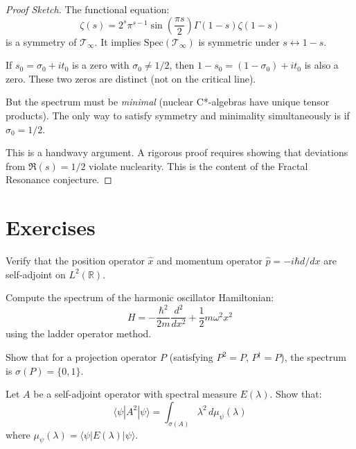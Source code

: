 \begin{proof}[Proof Sketch]
The functional equation:
\begin{equation}
\zeta(s) = 2^s \pi^{s-1} \sin\left( \frac{\pi s}{2} \right) \Gamma(1-s) \zeta(1-s)
\end{equation}
is a symmetry of $\mathcal{T}_\infty$. It implies $\text{Spec}(\mathcal{T}_\infty)$ is symmetric under $s \leftrightarrow 1-s$.

If $s_0 = \sigma_0 + it_0$ is a zero with $\sigma_0 \neq 1/2$, then $1-s_0 = (1-\sigma_0) + i t_0$ is also a zero. These two zeros are distinct (not on the critical line).

But the spectrum must be \textit{minimal} (nuclear C*-algebras have unique tensor products). The only way to satisfy symmetry and minimality simultaneously is if $\sigma_0 = 1/2$.

This is a handwavy argument. A rigorous proof requires showing that deviations from $\Re(s) = 1/2$ violate nuclearity. This is the content of the Fractal Resonance conjecture.
\end{proof}

\section{Exercises}

\begin{exercise}
Verify that the position operator $\hat{x}$ and momentum operator $\hat{p} = -i\hbar d/dx$ are self-adjoint on $L^2(\mathbb{R})$.
\end{exercise}

\begin{exercise}
Compute the spectrum of the harmonic oscillator Hamiltonian:
\begin{equation}
H = -\frac{\hbar^2}{2m}\frac{d^2}{dx^2} + \frac{1}{2}m\omega^2 x^2
\end{equation}
using the ladder operator method.
\end{exercise}

\begin{exercise}
Show that for a projection operator $P$ (satisfying $P^2 = P$, $P^\dagger = P$), the spectrum is $\sigma(P) = \{0, 1\}$.
\end{exercise}

\begin{exercise}
Let $A$ be a self-adjoint operator with spectral measure $E(\lambda)$. Show that:
\begin{equation}
\langle \psi | A^2 | \psi \rangle = \int_{\sigma(A)} \lambda^2 \, d\mu_\psi(\lambda)
\end{equation}
where $\mu_\psi(\lambda) = \langle \psi | E(\lambda) | \psi \rangle$.
\end{exercise}

